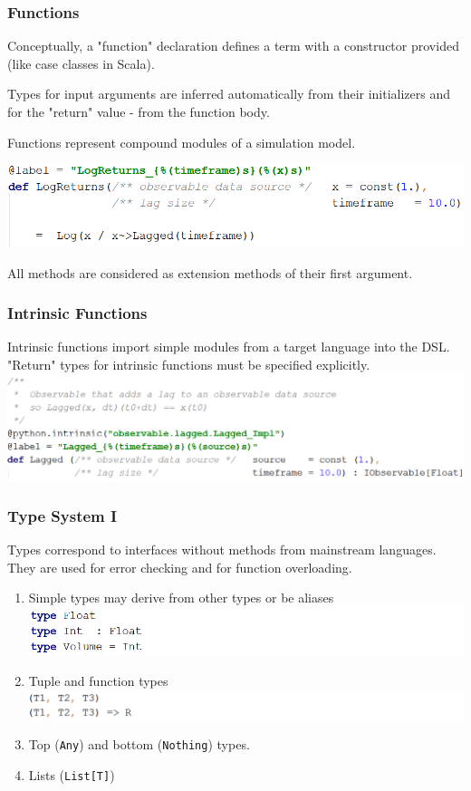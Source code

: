 \documentclass{beamer}
\begin{document}
\begin{frame}
\frametitle{Functions}
Conceptually, a "function" declaration defines a term with a constructor provided (like case classes in Scala). 

Types for input arguments are inferred automatically from their initializers and for the "return" value - from the function body.

Functions represent compound modules of a simulation model.

\includegraphics[width=1\linewidth]{logreturns.png}

All methods are considered as extension methods of their first argument.
\end{frame}
\begin{frame}
\frametitle{Intrinsic Functions}
Intrinsic functions import simple modules from a target language into the DSL. 
"Return" types for intrinsic functions must be specified explicitly.
\includegraphics[width=1\linewidth]{lagged.png}
\end{frame}
\begin{frame}
\frametitle{Type System I}
Types correspond to interfaces without methods from mainstream languages. They are used for error checking and for function overloading.
\begin{enumerate}
  \item Simple types may derive from other types or be aliases
  \includegraphics[width=1\linewidth]{intfloat.png}
  \item Tuple and function types
  \includegraphics[width=1\linewidth]{tuplefunction.png}
  \item Top (\texttt{Any}) and bottom (\texttt{Nothing}) types.
  \item Lists (\texttt{List[T]})
\end{enumerate}
\end{frame}
\end{document}
